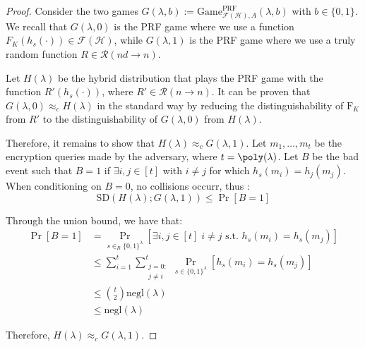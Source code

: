 \documentclass[a4paper, 12pt]{report}
\begin{document}
    \begin{proof}
        Consider the two games $G(\lambda, b) := \mathrm{Game}_{\mathcal{F}(\mathcal{H}), A}^{\text{PRF}}(\lambda, b)$ with $b \in \{0,1\}$. We recall that $G(\lambda, 0)$ is the PRF game where we use a function $F_K(h_s(\cdot)) \in \mathcal{F}(\mathcal{H})$, while $G(\lambda, 1)$ is the PRF game where we use a truly random function $R \in \mathcal{R}(nd \to n)$.

        Let $H(\lambda)$ be the hybrid distribution that plays the PRF game with the function $R'(h_s(\cdot))$, where $R' \in \mathcal{R}(n \to n)$. It can be proven that $G(\lambda,0) \approx_c H(\lambda)$ in the standard way by reducing the distinguishability of $\mathrm{F}_K$ from $R'$ to the distinguishability of $G(\lambda,0)$ from $H(\lambda)$.

        Therefore, it remains to show that $H(\lambda) \approx_c G(\lambda,1)$. Let $m_1, \ldots, m_t$ be the encryption queries made by the adversary, where $t = \poly(\lambda)$. Let $B$ be the bad event such that $B = 1$ if $\exists i,j \in [t]$ with $i \neq j$ for which $h_s(m_i) = h_j(m_j)$. When conditioning on $B = 0$, no collisions occurr, thus :
        \[\mathrm{SD}(H(\lambda); G(\lambda, 1)) \leq \Pr[B = 1]\]

        Through the union bound, we have that:
        \[\begin{split}
            \Pr[B = 1] &= \Pr_{s \in_R \{0,1\}^\lambda} [\exists i,j \in [t] \; i \neq j \text{ s.t. } h_s(m_i) = h_s(m_j)] \\
            &\leq \sum_{i = 1}^t \sum_{\substack{j = 0 :\\j \neq i}}^t \Pr_{s \in \{0,1\}^\lambda} [h_s(m_i) = h_s(m_j)] \\
            &\leq \binom{t}{2} \mathrm{negl}(\lambda) \\
            &\leq \mathrm{negl}(\lambda)
        \end{split}\]

        Therefore, $H(\lambda) \approx_c G(\lambda,1)$.
    \end{proof}
\end{document}
